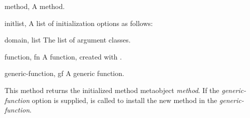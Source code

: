 %
\begin{optDefinition}
%
%
\begin{specargs}
    \item[method, \classref{method}] A method.

    \item[initlist, \classref{list}] A list of initialization options as follows:
    \begin{options}
        \item[domain, list] The list of argument classes.
        \item[function, fn] A function, created with
        .
        \item[generic-function, gf] A generic function.
    \end{options}
\end{specargs}
%
\result%
This method returns the initialized method metaobject {\em method}.  If
the {\em generic-function\/} option is supplied,  is called
to install the new method in the {\em generic-function}.
%
\end{optDefinition}

